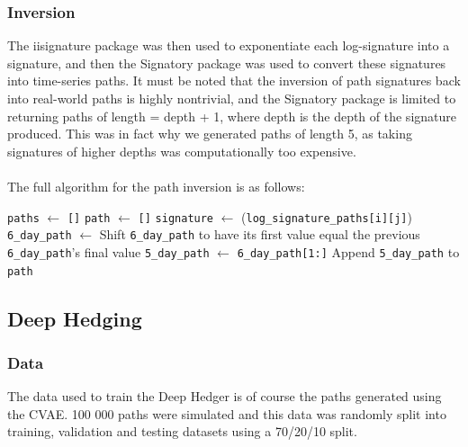 \documentclass{article}
\theoremstyle{definition}
\begin{document}
\subsubsection{Inversion}
The iisignature package \cite{iisignature} was then used to exponentiate each log-signature into a signature, and then the Signatory package \cite{kidger2021signatory}  was used to convert these signatures into time-series paths. It must be noted that the inversion of path signatures back into real-world paths is highly nontrivial, and the Signatory package is limited to returning paths of length = depth + 1, where depth is the depth of the signature produced. This was in fact why we generated paths of length 5, as taking signatures of higher depths was computationally too expensive. \\\\
The full algorithm for the path inversion is as follows:\\
\begin{algorithm}[H]
\caption{Signature Inversion}
\begin{algorithmic}
    \STATE \texttt{paths} $\gets$ \texttt{[]}
        \STATE \texttt{path} $\gets$ \texttt{[]}
           \STATE \texttt{signature} $\gets$ (\texttt{log\_signature\_paths[i][j]})
           \STATE \texttt{6\_day\_path} $\gets$ 
               \STATE Shift \texttt{6\_day\_path} to have its first value equal the previous  \texttt{6\_day\_path}'s final value
           \ENDIF
           \STATE \texttt{5\_day\_path} $\gets$ \texttt{6\_day\_path[1:]}
           \STATE Append \texttt{5\_day\_path} to \texttt{path}
        \ENDFOR
    \ENDFOR
\end{algorithmic} 
\end{algorithm}

\subsection{Deep Hedging}
\subsubsection{Data}
The data used to train the Deep Hedger is of course the paths generated using the CVAE. 100 000 paths were simulated and this data was randomly split into training, validation and testing datasets using a 70/20/10 split.
\end{document}
